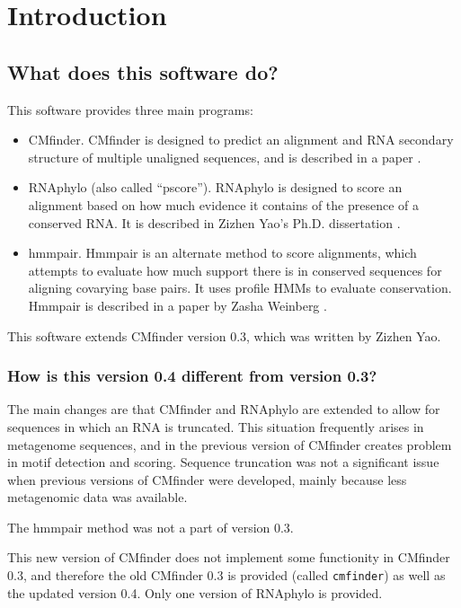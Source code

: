 \documentclass[letterpaper,12pt]{report}
\begin{document}
\clearpage\setcounter{page}{1}


\setcounter{tocdepth}{3}
\renewcommand\contentsname{}
\tableofcontents

\chapter{Introduction}

\section{What does this software do?}

This software provides three main programs:
\begin{itemize}
\item CMfinder. CMfinder is designed to predict an alignment and RNA secondary structure of multiple unaligned sequences, and is described in a paper \cite{yao:cmfinder}.
\item RNAphylo (also called ``pscore''). RNAphylo is designed to score an alignment based on how much evidence it contains of the presence of a conserved RNA.  It is described in Zizhen Yao's Ph.D. dissertation \cite{ZizhenThesis}.
\item hmmpair.  Hmmpair is an alternate method to score alignments, which attempts to evaluate how much support there is in conserved sequences for aligning covarying base pairs. It uses profile HMMs to evaluate conservation.
Hmmpair is described in a paper by Zasha Weinberg \cite{MotifsTwoTwoFour}.
\end{itemize}

This software extends CMfinder version 0.3, which was written by Zizhen Yao.

\subsection{How is this version 0.4 different from version 0.3?}

The main changes are that CMfinder and RNAphylo are extended to allow for sequences in which an RNA is truncated.  This situation frequently arises in metagenome sequences, and in the previous version of CMfinder creates problem in motif detection and scoring.  Sequence truncation was not a significant issue when previous versions of CMfinder were developed, mainly because less metagenomic data was available.

The hmmpair method was not a part of version 0.3.

This new version of CMfinder does not implement some functionity in CMfinder 0.3, and therefore the old CMfinder 0.3 is provided (called {\tt cmfinder}) as well as the updated version 0.4.  Only one version of RNAphylo is provided.
\end{document}
